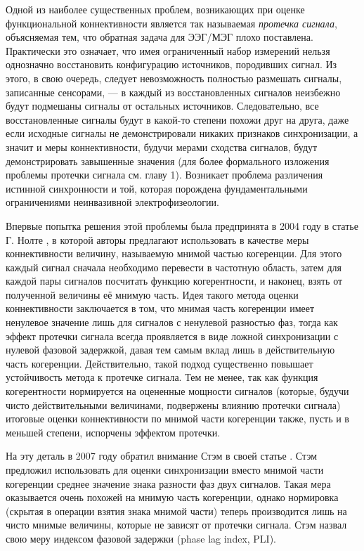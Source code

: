 Одной из наиболее существенных проблем, возникающих при оценке функциональной коннективности является 
так называемая \emph{протечка сигнала}, объясняемая тем, что обратная задача для ЭЭГ/МЭГ
плохо поставлена. Практически это означает, что имея ограниченный набор измерений нельзя однозначно восстановить 
конфигурацию источников, породивших сигнал. Из этого, в свою очередь, следует невозможность полностью 
размешать сигналы, записанные сенсорами, --- в каждый из восстановленных сигналов неизбежно будут
подмешаны сигналы от остальных источников. Следовательно, все восстановленные сигналы будут в какой-то 
степени похожи друг на друга, даже если исходные сигналы не демонстрировали никаких признаков синхронизации, а значит и 
меры коннективности, будучи мерами сходства сигналов, будут демонстрировать завышенные значения
(для более формального изложения проблемы протечки сигнала см. главу 1). Возникает проблема различения истинной синхронности 
и той, которая порождена фундаментальными ограничениями неинвазивной электрофизеологии.

Впервые попытка решения этой проблемы была предпринята в 2004 году в статье Г. Нолте
,
в которой авторы предлагают использовать в качестве меры коннективности величину, называемую мнимой частью когеренции. 
Для этого каждый сигнал сначала необходимо перевести в частотную область,
затем для каждой пары сигналов посчитать функцию когерентности, и наконец, взять от полученной величины её мнимую часть. 
Идея такого метода оценки коннективности заключается в том, что мнимая часть когеренции имеет ненулевое значение лишь 
для сигналов с ненулевой разностью фаз, тогда как эффект протечки сигнала всегда проявляется в виде ложной синхронизации 
с нулевой фазовой задержкой, давая тем самым вклад лишь в действительную часть когеренции. Действительно, такой подход 
существенно повышает устойчивость метода к протечке сигнала. Тем не менее, так как функция когерентности 
нормируется на оцененные мощности сигналов (которые, будучи чисто действительными величинами, подвержены влиянию 
протечки сигнала) итоговые оценки коннективности по мнимой части когеренции также, пусть и в меньшей степени, 
испорчены эффектом протечки. 

На эту деталь в 2007 году обратил внимание Стэм в своей статье 
. Стэм предложил использовать для оценки синхронизации 
вместо мнимой части когеренции среднее значение знака разности фаз двух сигналов. 
Такая мера оказывается очень похожей на мнимую часть когеренции, однако нормировка 
(скрытая в операции взятия знака мнимой части) теперь производится лишь на чисто мнимые величины, которые не 
зависят от протечки сигнала. Стэм назвал свою меру индексом фазовой задержки (phase lag index, PLI). 

